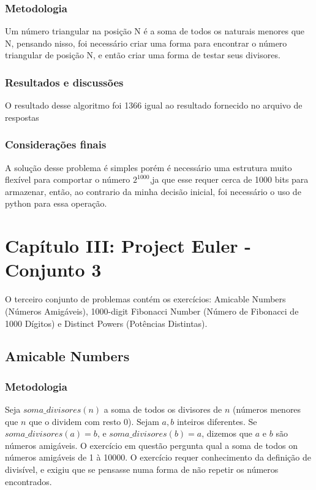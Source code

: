 \documentclass{article}
\begin{document}
        \subsubsection{Metodologia}
        Um número triangular na posição N é a soma de todos os naturais menores que N, pensando nisso, foi necessário criar uma forma para encontrar o número triangular de posição N, e então criar uma forma de testar seus divisores.
        
        \subsubsection{Resultados e discussões}
        O resultado desse algoritmo foi 1366 igual ao resultado fornecido no arquivo de respostas
        
        \subsubsection{Considerações finais}
        A solução desse problema é simples porém é necessário uma estrutura muito flexível para comportar o número $2^1000$,ja que esse requer cerca de 1000 bits para armazenar, então, ao contrario da minha decisão inicial, foi necessário o uso de python para essa operação.

\section{Capítulo III: Project Euler - Conjunto 3}
O terceiro conjunto de problemas contém os exercícios: Amicable Numbers (Números Amigáveis), 1000-digit Fibonacci Number (Número de Fibonacci de 1000 Dígitos) e Distinct Powers (Potências Distintas).
    \subsection{Amicable Numbers}
        
        \subsubsection{Metodologia}
        Seja $soma\_divisores(n)$ a soma de todos os divisores de $n$ (números menores que $n$ que o dividem com resto 0). Sejam $a, b$ inteiros diferentes. Se $soma\_divisores(a) = b$, e $soma\_divisores(b) = a$, dizemos que $a$ e $b$ são números amigáveis. O exercício em questão pergunta qual a soma de todos on números amigáveis de 1 à 10000.
        O exercício requer conhecimento da definição de divisível, e exigiu que se pensasse numa forma de não repetir os números encontrados.
        
\end{document}

